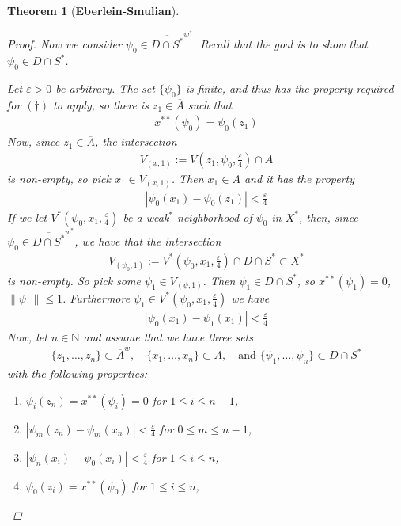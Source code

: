 \documentclass[10pt,twoside,openany,final]{memoir}
\theoremstyle{break}
\newtheorem{theorem}[section]{Theorem}
\theoremstyle{Break}
\newcommand{\lv}{\lVert}
\newcommand{\rv}{\rVert}
\newcommand{\N}{\mathbb{N}}
\begin{document}
\begin{theorem}[\bfseries{Eberlein-Smulian}]
\begin{proof}
Now we consider $\psi_{0} \in \overline{D\cap S^*}^{w^*}$. Recall that the goal is to show that $\psi_{0} \in D\cap S^*$.

Let $\varepsilon>0$ be arbitrary. The set $\{ \psi_{0} \}$ is finite, and thus has the property required for $(\dagger)$ to apply, so there is $z_{1} \in \overline{A}$ such that 
\begin{align*}
x^{**}(\psi_{0})=\psi_{0}(z_{1})
\end{align*}
Now, since $z_{1} \in \overline{A}$, the intersection 
\begin{align*}
V_{(x,1)}:=V\left(z_{1},\psi_{0},\frac{\varepsilon}{4}\right) \cap A
\end{align*}
is non-empty, so pick $x_{1} \in V_{(x,1)}$. Then $x_{1}\in A$ and it has the property
\begin{align*}
|\psi_{0}(x_{1})-\psi_{0}(z_{1})|<\frac{\varepsilon}{4}
\end{align*}
If we let $V^*\left(\psi_{0},x_{1},\frac{\varepsilon}{4} \right)$ be a weak$^*$ neighborhood of $\psi_{0}$ in $X^{*}$, then, since $\psi_{0} \in \overline{D \cap S^*}^{w^*}$, we have that the intersection
\begin{align*}
V_{(\psi_0,1)}:=V^*\left(\psi_{0},x_{1},\frac{\varepsilon}{4} \right) \cap {D \cap S^*} \subset X^*
\end{align*}
is non-empty. So pick some $\psi_{1} \in V_{(\psi,1)}$.
Then $\psi_{1} \in D\cap S^*$, so $x^{**}(\psi_{1})=0$, $\lv \psi_{1} \rv \leq 1$. Furthermore $\psi_{1} \in V^*\left(\psi_{0},x_{1},\frac{\varepsilon}{4} \right)$ we have
\begin{align*}
|\psi_{0}(x_{1})-\psi_{1}(x_{1})|< \frac{\varepsilon}{4}
\end{align*}
Now, let $n \in \N$ and assume that we have three sets
\begin{align*}
\{z_{1},\dots,z_{n}\} \subset \overline{A}^w, \quad \{ x_{1},\dots,x_{n}\} \subset A, \quad \text{and }\{\psi_{1},\dots,\psi_{n}\} \subset D\cap S^*
\end{align*}
with the following properties:
\begin{enumerate}
\item $\psi_{i}(z_{n})=x^{**}(\psi_{i})=0$ for $1 \leq i \leq n-1$,
\item $|\psi_{m}(z_{n})-\psi_{m}(x_{n})| < \frac{\varepsilon}{4}$ for $0 \leq m \leq n-1$,
\item $|\psi_{n}(x_{i})-\psi_{0}(x_{i})| < \frac{\varepsilon}{4}$ for $1 \leq i \leq n$,
\item $\psi_{0}(z_{i})=x^{**}(\psi_{0})$ for $1 \leq i \leq n$,

\end{enumerate}
\end{proof}
\end{theorem}
\end{document}
